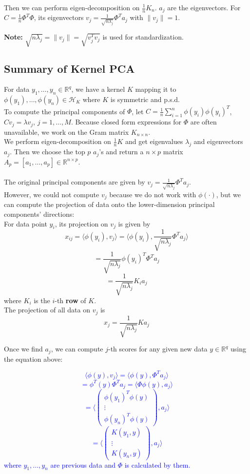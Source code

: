 \documentclass[12pt]{book}
\theoremstyle{definition}
\theoremstyle{remark}
\newcommand{\R}{\mathbb{R}}
\begin{document}
Then we can perform eigen-decomposition on $\frac1nK_n$. $a_j$ are the eigenvectors. For $C = \frac1n\Phi^T\Phi$, its eigenvectors $v_j = \frac{1}{\sqrt{n\lambda_j}}\Phi^Ta_j$ with $\|v_j\| = 1$. 


\textbf{Note: }$\sqrt{n\lambda_j} = \|v_j\| = \sqrt{v_j^Tv_j}$ is used for standardization.

\subsection{Summary of Kernel PCA}
For data $y_1,\dots,y_n\in \R^q$, we have a kernel $K$ mapping it to $\phi(y_1), \dots, \phi(y_n)\in\mathcal{H}_K$ where $K$ is symmetric and p.s.d.\\
To compute the principal components of $\Phi$, let $C = \frac1n\sum_{i=1}^n\phi(y_i)\phi(y_i)^T$, $Cv_j = \lambda v_j$, $j = 1,\dots, M$.
Because closed form expressions for $\Phi$ are often unavailable, we work on the Gram matrix $K_{n\times n}$. \\
We perform eigen-decomposition on $\frac1nK$ and get eigenvalues $\lambda_j$ and eigenvectors $a_j$. Then we choose the top $p$ $a_j$'s and return a $n\times p$ matrix $A_p = [a_1, \dots, a_p]\in \R^{n\times p}$.\\
\\
The original principal components are given by $v_j = \frac{1}{\sqrt{n\lambda_j}}\Phi^Ta_j$.\\
However, we could not compute $v_j$ because we do not work with $\phi(\cdot)$, but we can compute the projection of data onto the lower-dimension principal components' directions:\\
For data point $y_i$, its projection on $v_j$ is given by
\[x_{ij} = \langle\phi(y_i), v_j\rangle = \langle \phi(y_i), \frac{1}{\sqrt{n\lambda_j}} \Phi^T a_j \rangle\]
\[=\frac{1}{\sqrt{n\lambda_j}}\phi(y_i)^T \Phi^T a_j\]
\[= \frac{1}{\sqrt{n\lambda_j}}K_i a_j\]
where $K_i$ is the $i$-th \textbf{row} of $K$.\\
The projection of all data on $v_j$ is
\[x_j = \frac{1}{\sqrt{n\lambda_j}}Ka_j\]

Once we find $a_j$, we can compute $j$-th scores for any given new data $y\in \R^q$ using the equation above:

\textcolor{blue}{
\[\langle \phi(y), v_j\rangle = \langle\phi(y),\Phi^T a_j\rangle\]
\[= \phi^T(y)\Phi^Ta_j = \langle\Phi\phi(y), a_j\rangle\]
\[= \langle \begin{pmatrix}
 \phi(y_1)^T\phi(y)\\
 \vdots\\
 \phi(y_n)^T\phi(y)
\end{pmatrix},a_j\rangle\]
\[ = \langle \begin{pmatrix}
 K(y_1,y)\\
 \vdots\\
 K(y_n,y)
\end{pmatrix},a_j\rangle\]
where $y_1,\dots, y_n$ are previous data and $\Phi$ is calculated by them.
}
\end{document}
